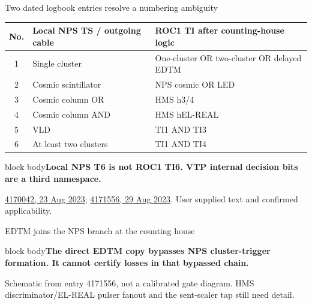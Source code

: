 \documentclass[aspectratio=169,11pt]{beamer}
\newcommand{\source}[1]{\par\vfill{\scriptsize\color{muted}#1\par}}
\newcommand{\takeaway}[1]{\begin{beamercolorbox}[sep=2.5mm,wd=\linewidth]{block body}\textbf{#1}\end{beamercolorbox}}
\begin{document}
\begin{frame}{Two dated logbook entries resolve a numbering ambiguity}
\small\renewcommand{\arraystretch}{1.3}
\begin{tabular}{@{}cp{.34\linewidth}p{.49\linewidth}@{}}\toprule
No. & Local NPS TS / outgoing cable & ROC1 TI after counting-house logic\\\midrule
1 & Single cluster & One-cluster OR two-cluster OR delayed EDTM\\
2 & Cosmic scintillator & NPS cosmic OR LED\\
3 & Cosmic column OR & HMS h3/4\\
4 & Cosmic column AND & HMS hEL-REAL\\
5 & VLD & TI1 AND TI3\\
6 & At least two clusters & TI1 AND TI4\\\bottomrule
\end{tabular}\vspace{2mm}
\takeaway{Local NPS T6 is not ROC1 TI6. VTP internal decision bits are a third namespace.}
\source{\href{https://logbooks.jlab.org/entry/4170042}{4170042, 23 Aug 2023}; \href{https://logbooks.jlab.org/entry/4171556}{4171556, 29 Aug 2023}. User supplied text and confirmed applicability.}
\end{frame}

\begin{frame}{EDTM joins the NPS branch at the counting house}
\centering
{}
\vspace{2mm}\takeaway{The direct EDTM copy bypasses NPS cluster-trigger formation. It cannot certify losses in that bypassed chain.}
\source{Schematic from entry 4171556, not a calibrated gate diagram. HMS discriminator/EL-REAL pulser fanout and the sent-scaler tap still need detail.}
\end{frame}
\end{document}
